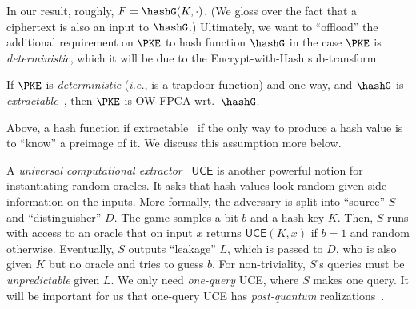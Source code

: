 In our result, roughly, $F = \hashG(K,\cdot)$. (We gloss over the fact that a ciphertext is also an input to $\hashG$.) 
Ultimately, we want to  ``offload'' the  additional requirement on $\PKE$ to  hash function $\hashG$ in the case $\PKE$ is \emph{deterministic}, which it will be due to the Encrypt-with-Hash sub-transform:

\begin{conj} \label{conj-ext}
    If $\PKE$ is \emph{deterministic} (\emph{i.e.}, is a trapdoor function) and one-way, and $\hashG$ is \emph{extractable}~\cite{TCC:CanDak09}, then $\PKE$  is OW-FPCA wrt.~$\hashG$.
\end{conj} 

\noindent Above, a hash function if extractable~\cite{TCC:CanDak09} if the only way to produce a hash value is to ``know'' a preimage of it.  We discuss this assumption more below. %

 A \emph{universal computational extractor}~\cite{C:BelHoaKee13} $\mathsf{UCE}$ is another powerful notion for  instantiating random oracles. It asks that hash values look random given side information on the inputs.   More formally, the adversary is split into ``source'' $S$ and ``distinguisher'' $D$. The game samples a  bit $b$ and a hash key $K$. Then, $S$ runs with access to an oracle that on input $x$ returns $\mathsf{UCE}(K,x)$ if $b = 1$ and random otherwise. Eventually, $S$ outputs ``leakage'' $L$, which is passed to $D$, who is also given $K$ but no oracle and tries to guess $b$. For non-triviality,  $S$'s queries must be \emph{unpredictable} given $L$. 
We only need \emph{one-query} UCE, where $S$  makes one query.  It will be important for us that one-query UCE has \emph{post-quantum} realizations~\cite{EC:CheMao25}.

